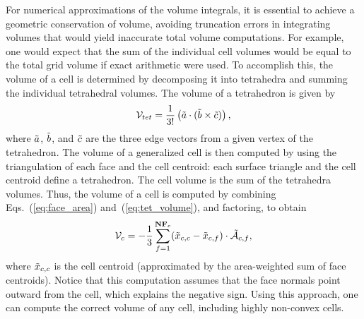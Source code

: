 For numerical approximations of the volume integrals, it is essential to
achieve a geometric conservation of volume, avoiding
truncation errors in integrating volumes that would yield inaccurate total
volume computations.  For example, one would expect that the sum of the
individual cell volumes would be equal to the total grid volume if exact
arithmetic were used.  To accomplish this, the volume of a cell is determined
by decomposing it into tetrahedra and summing the individual
tetrahedral volumes.  The volume of a tetrahedron is given by
\begin{equation}
\mathcal{V}_{tet} = \frac{1}{3!} \left(\Tilde{a} \cdot (\Tilde{b} \times
  \Tilde{c})\right),
\label{eq:tet_volume}
\end{equation}
where $\Tilde{a}$, $\Tilde{b}$, and $\Tilde{c}$ are the three edge vectors
from a given vertex of the tetrahedron.  The volume of a generalized
cell is then computed by using the triangulation of each face and the
cell centroid: each surface triangle and the cell centroid define a
tetrahedron.  The cell volume is the sum of the tetrahedra volumes.
Thus, the volume of a cell is computed by combining
Eqs.~(\ref{eq:face_area}) and~(\ref{eq:tet_volume}), and factoring, to obtain
\begin{equation}
\mathcal{V}_c = -\frac{1}{3} \sum_{f=1}^{\mathbf{NF}_c} (\Tilde{x}_{c,c}-
\Tilde{x}_{c,f}) \cdot \Tilde{\mathcal{A}}_{c,f},
\end{equation}
where $\Tilde{x}_{c,c}$ is the cell centroid (approximated by the
area-weighted sum of face centroids).  Notice that this computation assumes
that the face normals point outward from the cell, which explains the
negative sign. Using this
approach, one can compute the correct volume of any cell, including
highly non-convex cells.




